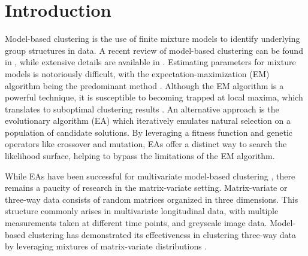 \documentclass[12pt]{report}
\begin{document}
\beforepreface





\tableofcontents
\cleardoublepage
{}
{}
\listoftables
\cleardoublepage
{}
{}
\listoffigures
\label{NumPrefacePages}
\newpage
{}
\pagestyle{fancy}





\chapter{Introduction}

Model-based clustering is the use of finite mixture models to identify underlying group structures in data. A recent review of model-based clustering can be found in \citet{mcnicholas2016b}, while extensive details are available in \citet{mcnicholas2016a}. Estimating parameters for mixture models is notoriously difficult, with the expectation-maximization (EM) algorithm being the predominant method \citep{dempster1977}. Although the EM algorithm is a powerful technique, it is susceptible to becoming trapped at local maxima, which translates to suboptimal clustering results \citep{titterington1985}. An alternative approach is the evolutionary algorithm (EA) which iteratively emulates natural selection on a population of candidate solutions. By leveraging a fitness function and genetic operators like crossover and mutation, EAs offer a distinct way to search the likelihood surface, helping to bypass the limitations of the EM algorithm. 

While EAs have been successful for multivariate model-based clustering \citep{andrews2013,mcnicholas2020}, there remains a paucity of research in the matrix-variate setting. Matrix-variate or three-way data consists of random matrices organized in three dimensions. This structure commonly arises in multivariate longitudinal data, with multiple measurements taken at different time points, and greyscale image data. Model-based clustering has demonstrated its effectiveness in clustering three-way data by leveraging mixtures of matrix-variate distributions \citep{viroli2011, anderlucci2015, dogru2016, gallaugher2018, silva2023}.
\end{document}
